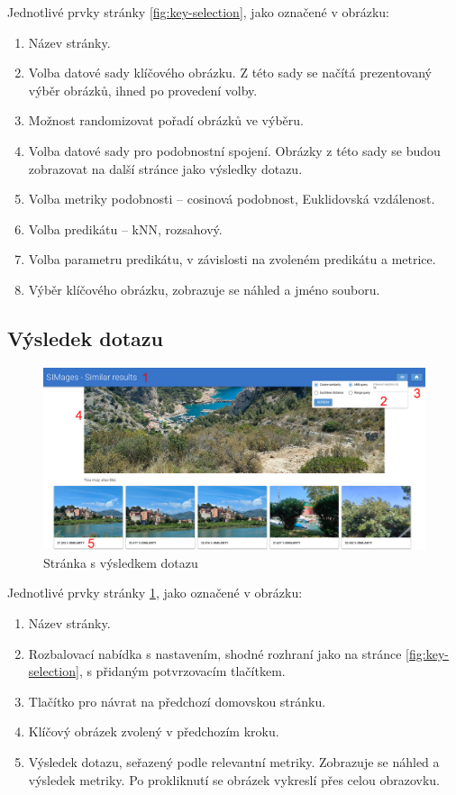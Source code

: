 \documentclass[12pt]{article}
\begin{document}
Jednotlivé prvky stránky \ref{fig:key-selection}, jako označené v obrázku:

\begin{enumerate}
    \item Název stránky.
    \item Volba datové sady klíčového obrázku. Z této sady se načítá prezentovaný výběr obrázků, ihned po provedení volby.
    \item Možnost randomizovat pořadí obrázků ve výběru.
    \item Volba datové sady pro podobnostní spojení. Obrázky z této sady se budou zobrazovat na další stránce jako výsledky dotazu.
    \item Volba metriky podobnosti -- cosinová podobnost, Euklidovská vzdálenost.
    \item Volba predikátu -- kNN, rozsahový.
    \item Volba parametru predikátu, v závislosti na zvoleném predikátu a metrice.
    \item Výběr klíčového obrázku, zobrazuje se náhled a jméno souboru.
\end{enumerate}

\subsection{Výsledek dotazu}

\begin{figure}[h]
    \centering
    \includegraphics[width=0.9\linewidth]{similar_results_annotated.png}
    \caption{Stránka s výsledkem dotazu}
    \label{fig:similar-results}
\end{figure}

Jednotlivé prvky stránky \ref{fig:similar-results}, jako označené v obrázku:

\begin{enumerate}
    \item Název stránky.
    \item Rozbalovací nabídka s nastavením, shodné rozhraní jako na stránce \ref{fig:key-selection}, s přidaným potvrzovacím tlačítkem.
    \item Tlačítko pro návrat na předchozí domovskou stránku.
    \item Klíčový obrázek zvolený v předchozím kroku.
    \item Výsledek dotazu, seřazený podle relevantní metriky. Zobrazuje se náhled a výsledek metriky. Po prokliknutí se obrázek vykreslí přes celou obrazovku.
\end{enumerate}
\end{document}
